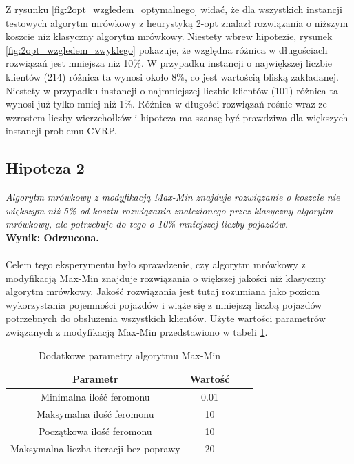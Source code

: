 \documentclass{article}
\begin{document}
\noindent Z rysunku \ref{fig:2opt_wzgledem_optymalnego} widać, że dla wszystkich instancji testowych algorytm mrówkowy z heurystyką 2-opt znalazł rozwiązania o niższym koszcie niż klasyczny algorytm mrówkowy. Niestety wbrew hipotezie, rysunek \ref{fig:2opt_wzgledem_zwyklego} pokazuje, że względna różnica w długościach rozwiązań jest mniejsza niż 10\%. W przypadku instancji o największej liczbie klientów (214) różnica ta wynosi około 8\%, co jest wartością bliską zakładanej. Niestety w przypadku instancji o najmniejszej liczbie klientów (101) różnica ta wynosi już tylko mniej niż 1\%. Różnica w długości rozwiązań rośnie wraz ze wzrostem liczby wierzchołków i hipoteza ma szansę być prawdziwa dla większych instancji problemu CVRP.

\subsection{Hipoteza 2}
\textit{Algorytm mrówkowy z modyfikacją Max-Min znajduje rozwiązanie o koszcie nie większym niż 5\% od kosztu rozwiązania znalezionego przez klasyczny algorytm mrówkowy, ale potrzebuje do tego o 10\% mniejszej liczby pojazdów.}
\\
\textbf{Wynik: Odrzucona.}
\\ \\
\noindent Celem tego eksperymentu było sprawdzenie, czy algorytm mrówkowy z modyfikacją Max-Min znajduje rozwiązania o większej jakości niż klasyczny algorytm mrówkowy. Jakość rozwiązania jest tutaj rozumiana jako poziom wykorzystania pojemności pojazdów i wiąże się z mniejszą liczbą pojazdów potrzebnych do obsłużenia wszystkich klientów. Użyte wartości parametrów związanych z modyfikacją Max-Min przedstawiono w tabeli \ref{tab:maxmin_params}.

\begin{table}[H]
    \centering
    \begin{tabular}{|c|c|c|c|}
        \hline
        \textbf{Parametr} & \textbf{Wartość} \\
        \hline
        Minimalna ilość feromonu & 0.01 \\
        \hline
        Maksymalna ilość feromonu & 10 \\
        \hline
        Początkowa ilość feromonu & 10 \\
        \hline
        Maksymalna liczba iteracji bez poprawy & 20 \\
        \hline
    \end{tabular}
    \caption{Dodatkowe parametry algorytmu Max-Min}
    \label{tab:maxmin_params}
\end{table}
\end{document}
